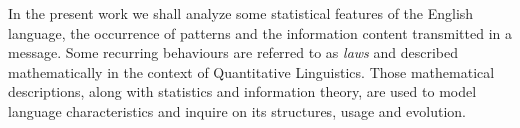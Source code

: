 In the present work we shall analyze some statistical features of the English language, the occurrence 
of patterns and the information content transmitted in a message. Some recurring behaviours are referred to as 
\emph{laws} and described mathematically in the context of Quantitative Linguistics.
Those mathematical descriptions, along with statistics and information theory, 
are used to model language characteristics and inquire on its structures, usage and evolution.



